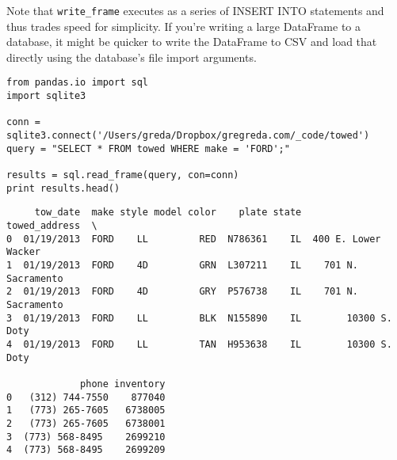 \documentclass[KSmain.tex]{subfiles}
\begin{document}
Note that \texttt{write\_frame} executes as a series of INSERT INTO statements and thus trades speed for simplicity. If you're writing a large DataFrame to a database, it might be quicker to write the DataFrame to CSV and load that directly using the database's file import arguments.

\begin{framed}
\begin{verbatim}
from pandas.io import sql
import sqlite3

conn = sqlite3.connect('/Users/greda/Dropbox/gregreda.com/_code/towed')
query = "SELECT * FROM towed WHERE make = 'FORD';"

results = sql.read_frame(query, con=conn)
print results.head()
\end{verbatim}
\end{framed}
\begin{verbatim}
     tow_date  make style model color    plate state        towed_address  \
0  01/19/2013  FORD    LL         RED  N786361    IL  400 E. Lower Wacker   
1  01/19/2013  FORD    4D         GRN  L307211    IL    701 N. Sacramento   
2  01/19/2013  FORD    4D         GRY  P576738    IL    701 N. Sacramento   
3  01/19/2013  FORD    LL         BLK  N155890    IL        10300 S. Doty   
4  01/19/2013  FORD    LL         TAN  H953638    IL        10300 S. Doty   

             phone inventory  
0   (312) 744-7550    877040  
1   (773) 265-7605   6738005  
2   (773) 265-7605   6738001  
3  (773) 568-8495    2699210  
4  (773) 568-8495    2699209  

\end{verbatim}
\end{document}
